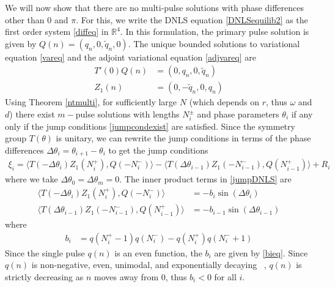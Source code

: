\documentclass[12pt]{elsarticle}
\def\R{{\mathbb R}}
\begin{document}
We will now show that there are no multi-pulse solutions with phase differences other than $0$ and $\pi$. For this, we write the DNLS equation \eqref{DNLSequilib2} as the first order system \eqref{diffeq} in $\R^4$. In this formulation, the primary pulse solution is given by $Q(n) = (q_n, 0, \tilde{q}_n, 0)$. The unique bounded solutions to variational equation \eqref{vareq} and the adjoint variational equation \eqref{adjvareq} are
\begin{align*}
T'(0) Q(n) &= (0, q_n, 0, \tilde{q}_n) \\
Z_1(n) &= (0, -\tilde{q}_n, 0, q_n)
\end{align*}
Using Theorem \ref{ntmulti}, for sufficiently large $N$ (which depends on $r$, thus $\omega$ and $d$) there exist $m-$pulse solutions with lengths $N_i^\pm$ and phase parameters $\theta_i$ if any only if the jump conditions \eqref{jumpcondexist} are satisfied. Since the symmetry group $T(\theta)$ is unitary, we can rewrite the jump conditions in terms of the phase differences $\Delta \theta_i = \theta_{i+1} - \theta_i$ to get the jump conditions
\begin{align}\label{jumpDNLS}
\xi_i = \langle T(-\Delta \theta_i) Z_1(N_i^+), Q(-N_i^-) \rangle
- \langle T(\Delta \theta_{i-1}) Z_1(-N_{i-1}^-), Q(N_{i-1}^+) \rangle + R_i
\end{align}
where we take $\Delta \theta_0 = \Delta \theta_m = 0$. The inner product terms in \eqref{jumpDNLS} are
\begin{equation}\label{jumpIPs}
\begin{aligned}
\langle T(-\Delta\theta_i) Z_1(N_i^+), Q(-N_i^-) \rangle 
&= -b_i \sin(\Delta\theta_i) \\
\langle T(\Delta\theta_{i-1}) Z_1(-N_{i-1}^-), Q(N_{i-1}^+) \rangle &= -b_{i-1} \sin(\Delta\theta_{i-1})
\end{aligned}
\end{equation}
where 
\begin{align*}
b_i &= q(N_i^+ - 1)q(N_i^-) - q(N_i^+)q(N_i^- + 1)
\end{align*}
Since the single pulse $q(n)$ is an even function, the $b_i$ are given by \eqref{bieq}. Since $q(n)$ is non-negative, even, unimodal, and exponentially decaying ~\cite[Theorem 1]{herrmann_2011}, $q(n)$ is strictly decreasing as $n$ moves away from 0, thus $b_i < 0$ for all $i$. 
\end{document}
